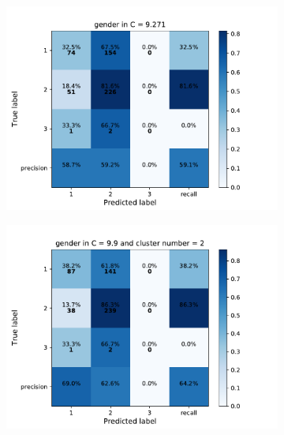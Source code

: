 {\begin{figure}[h]
    \centering
    \begin{subfigure}
      \centering
      \includegraphics[scale=0.45]{fig/super_svm_gender.pdf}
    \end{subfigure}%
    \begin{subfigure}
      \centering
      \includegraphics[scale=0.45]{fig/kms_svm_gender.pdf}
    \end{subfigure}
\end{figure}

}
